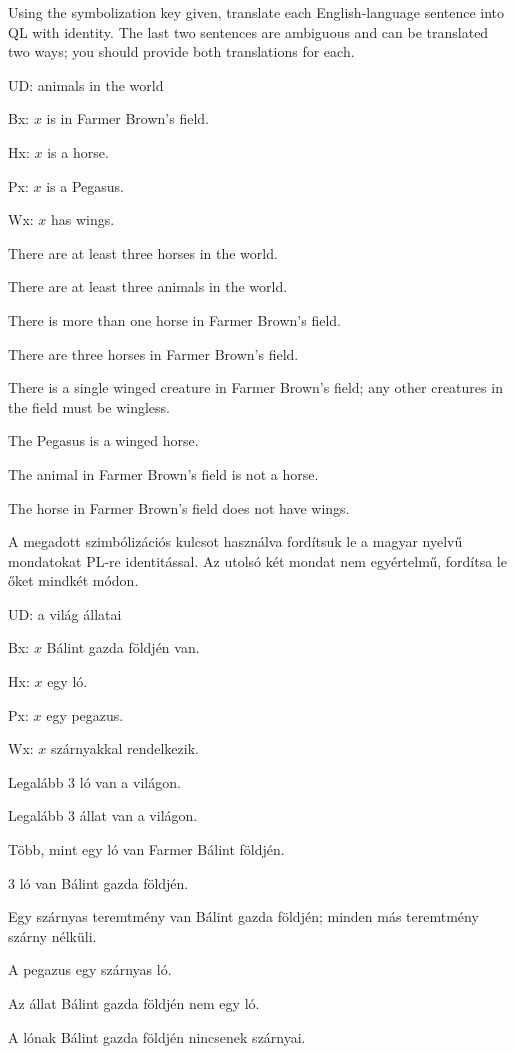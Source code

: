 \problempart Using the symbolization key given, translate each English-language sentence into QL with identity. The last two sentences are ambiguous and can be translated two ways; you should provide both translations for each.
\begin{ekey}
\item[UD:] animals in the world
\item[Bx:] $x$ is in Farmer Brown's field.
\item[Hx:] $x$ is a horse.
\item[Px:] $x$ is a Pegasus.
\item[Wx:] $x$ has wings.
\end{ekey}
\begin{earg}
\item There are at least three horses in the world.
\item There are at least three animals in the world.
\item There is more than one horse in Farmer Brown's field.
\item There are three horses in Farmer Brown's field.
\item There is a single winged creature in Farmer Brown's field; any other creatures in the field must be wingless.
\item The Pegasus is a winged horse.
\item The animal in Farmer Brown's field is not a horse.
\item The horse in Farmer Brown's field does not have wings.
\end{earg}

\problempart 
A megadott szimbólizációs kulcsot használva fordítsuk le a magyar nyelvű mondatokat PL-re identitással. Az utolsó két mondat nem egyértelmű, fordítsa le őket mindkét módon.
\begin{ekey}
\item[UD:] a világ állatai
\item[Bx:] $x$ Bálint gazda földjén van.
\item[Hx:] $x$ egy ló.
\item[Px:] $x$ egy pegazus.
\item[Wx:] $x$ szárnyakkal rendelkezik.
\end{ekey}
\begin{earg}
\item Legalább 3 ló van a világon.
\item Legalább 3 állat van a világon.
\item Több, mint egy ló van Farmer Bálint földjén.
\item 3 ló van Bálint gazda földjén.
\item Egy szárnyas teremtmény van Bálint gazda földjén; minden más teremtmény szárny nélküli.
\item A pegazus egy szárnyas ló.
\item Az állat Bálint gazda földjén nem egy ló.
\item A lónak Bálint gazda földjén nincsenek szárnyai.
\end{earg}




